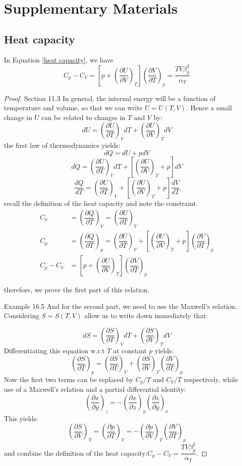 \documentclass[UTF8]{book}
\begin{document}
\chapter{Supplementary Materials}
\section{Heat capacity}
In Equation \ref{heat capacity}, we have
$$C_p-C_V=\left[p+\left(\dfrac{\partial U}{\partial V}\right)_T\right]\left(\dfrac{\partial V}{\partial T}\right)_p=\dfrac{TV\beta _p^2}{\alpha _T }$$
\begin{proof}
\textsf{Section 11.3 \cite{blundell2009concepts}} {In general, the internal energy will be a function of temperature and volume, so that we can write $U=U(T,V)$. Hence a small change in $U$ can be related to changes in $T$ and $V$ by:}
$$dU=\left(\dfrac{\partial U}{\partial T}\right)_VdT+\left(\dfrac{\partial U}{\partial V}\right)_TdV$$
 {the first law of thermodynamics yields:}
$$dQ=dU+pdV$$
$$dQ=\left(\dfrac{\partial U}{\partial T}\right)_VdT+\left[\left(\dfrac{\partial U}{\partial V}\right)_T+p\right]dV$$
$$\dfrac{dQ}{dT}=\left(\dfrac{\partial U}{\partial T}\right)_V+\left[\left(\dfrac{\partial U}{\partial V}\right)_T+p\right]\dfrac{dV}{dT}$$
 {recall the definition of the heat capacity and note the constraint.}
\begin{align*}
C_V&=\left(\dfrac{\partial Q}{\partial T}\right)_V=\left(\dfrac{\partial U}{\partial T}\right)_V\\
C_p&=\left(\dfrac{\partial Q}{\partial T}\right)_p=\left(\dfrac{\partial U}{\partial T}\right)_V+\left[\left(\dfrac{\partial U}{\partial V}\right)_T+p\right]\left(\dfrac{\partial V}{\partial T}\right)_p\\
C_p-C_V&=\left[p+\left(\dfrac{\partial U}{\partial V}\right)_T\right]\left(\dfrac{\partial V}{\partial T}\right)_p
\end{align*}
 {therefore, we prove the first part of this relation. 
 
 \textsf{Example 16.5 \cite{blundell2009concepts}}
 And for the second part, we need to use the Maxwell's relation. Considering $S=S(T,V)$ allow us to write down immediately that:}
$$dS=\left(\dfrac{\partial S}{\partial T}\right)_VdT+\left(\dfrac{\partial S}{\partial V}\right)_TdV$$
 {Differentiating this equation w.r.t $T$ at constant $p$ yields:}
$$\left(\dfrac{\partial S}{\partial T}\right)_p=\left(\dfrac{\partial S}{\partial T}\right)_V+\left(\dfrac{\partial S}{\partial V}\right)_T\left(\dfrac{\partial V}{\partial T}\right)_p$$
 {Now the first two terms can be replaced by $C_p/T$ and $C_V/T$ respectively, while use of a Maxwell's relation and a partial differential identity:}
$$\left(\dfrac{\partial x}{\partial y}\right)_z=-\left(\dfrac{\partial x}{\partial z}\right)_y\left(\dfrac{\partial z}{\partial y}\right)_x$$
 {This yields:}
\[\left(\dfrac{\partial S}{\partial V}\right)_T=\left(\dfrac{\partial p}{\partial T}\right)_V=-\left(\dfrac{\partial p}{\partial V}\right)_T\left(\dfrac{\partial V}{\partial T}\right)_p\]
and combine the definition of the heat capacity:$C_p-C_V=\dfrac{TV\beta _p^2}{\alpha _T }.$
\end{proof}



\end{document}
